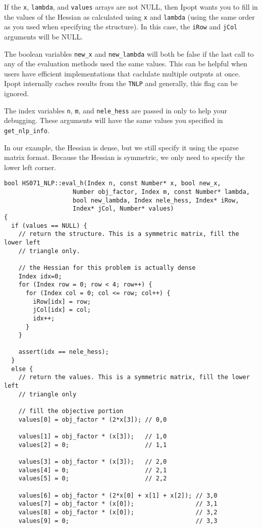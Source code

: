 \documentclass[letter,10pt]{article}
\begin{document}
{If the {\tt x}, {\tt lambda}, and {\tt values} arrays are not NULL,
then Ipopt wants you to fill in the values of the Hessian as
calculated using {\tt x} and {\tt lambda} (using the same order as you
used when specifying the structure). In this case, the {\tt iRow} and
{\tt jCol} arguments will be NULL.

The boolean variables {\tt new\_x} and {\tt new\_lambda} will both be
false if the last call to any of the evaluation methods used the same
values. This can be helpful when users have efficient implementations
that caclulate multiple outputs at once. Ipopt internally caches
results from the {\tt TNLP} and generally, this flag can be ignored.

The index variables {\tt n}, {\tt m}, and {\tt nele\_hess} are passed
in only to help your debugging. These arguments will have the same
values you specified in {\tt get\_nlp\_info}.

In our example, the Hessian is dense, but we still specify it using the
sparse matrix format. Because the Hessian is symmetric, we only need to 
specify the lower left corner.
\begin{verbatim}
bool HS071_NLP::eval_h(Index n, const Number* x, bool new_x,
                   Number obj_factor, Index m, const Number* lambda,
                   bool new_lambda, Index nele_hess, Index* iRow,
                   Index* jCol, Number* values)
{
  if (values == NULL) {
    // return the structure. This is a symmetric matrix, fill the lower left
    // triangle only.

    // the Hessian for this problem is actually dense
    Index idx=0;
    for (Index row = 0; row < 4; row++) {
      for (Index col = 0; col <= row; col++) {
        iRow[idx] = row; 
        jCol[idx] = col;
        idx++;
      }
    }
    
    assert(idx == nele_hess);
  }
  else {
    // return the values. This is a symmetric matrix, fill the lower left
    // triangle only

    // fill the objective portion
    values[0] = obj_factor * (2*x[3]); // 0,0

    values[1] = obj_factor * (x[3]);   // 1,0
    values[2] = 0;                     // 1,1

    values[3] = obj_factor * (x[3]);   // 2,0
    values[4] = 0;                     // 2,1
    values[5] = 0;                     // 2,2

    values[6] = obj_factor * (2*x[0] + x[1] + x[2]); // 3,0
    values[7] = obj_factor * (x[0]);                 // 3,1
    values[8] = obj_factor * (x[0]);                 // 3,2
    values[9] = 0;                                   // 3,3



\end{verbatim}}
\end{document}
